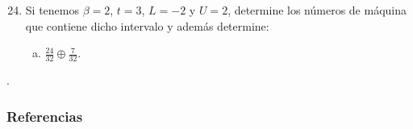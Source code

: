 \documentclass[
	spanish,
	8pt,
	utf8,
	xcolor=table,
	handout,
	aspectratio=169,
	professionalfonts,
	mathserif,
	leqno,
]{beamer}
\begin{document}
\begin{frame}
	\begin{enumerate}\setcounter{enumi}{23}
		\item

		      Si tenemos $\beta=2$, $t=3$, $L=-2$ y $U=2$, determine los
		      números de máquina que contiene dicho intervalo y además
		      determine:

		      \begin{enumerate}[b)]
			      \item

			            $\frac{24}{32}\oplus\frac{7}{32}$.
		      \end{enumerate}
	\end{enumerate}

	\begin{solution}
		.
	\end{solution}
\end{frame}

\begin{frame}\transblindsvertical
	\frametitle{Referencias}
\end{frame}
\end{document}
